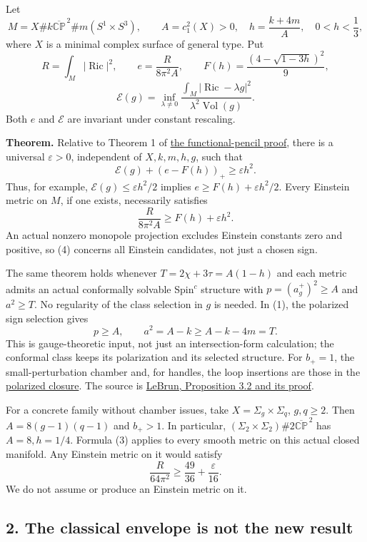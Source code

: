 \documentclass[
  10pt,
]{article}
\begin{document}
Let \[
 M=X\#k\overline{\mathbb {CP}}^{\,2}\#m(S^1\times S^3),\qquad
 A=c_1^2(X)>0,\quad h=\frac{k+4m}{A},\quad 0<h<\frac13,
 \tag{1}
\] where \(X\) is a minimal complex surface of general type. Put \[
 R=\int_M|\operatorname{Ric}|^2,\qquad
 e=\frac{R}{8\pi^2A},\qquad
 F(h)=\frac{(4-\sqrt{1-3h})^2}{9},
\] \[
 \mathcal E(g)=\inf_{\lambda\ne0}
 \frac{\int_M|\operatorname{Ric}-\lambda g|^2}
      {\lambda^2\operatorname{Vol}(g)}.
 \tag{2}
\] Both \(e\) and \(\mathcal E\) are invariant under constant rescaling.

\textbf{Theorem.} Relative to Theorem 1 of
\href{line1_functional_pencil.md}{the functional-pencil proof}, there is
a universal \(\varepsilon>0\), independent of \(X,k,m,h,g\), such that
\[
 \boxed{\mathcal E(g)+(e-F(h))_+\ge\varepsilon h^2.}
 \tag{3}
\] Thus, for example, \(\mathcal E(g)\le\varepsilon h^2/2\) implies
\(e\ge F(h)+\varepsilon h^2/2\). Every Einstein metric on \(M\), if one
exists, necessarily satisfies \[
 \boxed{\frac{R}{8\pi^2A}\ge F(h)+\varepsilon h^2.}
 \tag{4}
\] An actual nonzero monopole projection excludes Einstein constants
zero and positive, so (4) concerns all Einstein candidates, not just a
chosen sign.

The same theorem holds whenever \(T=2\chi+3\tau=A(1-h)\) and each metric
admits an actual conformally solvable Spin\(^c\) structure with
\(p=(a_g^+)^2\ge A\) and \(a^2\ge T\). No regularity of the class
selection in \(g\) is needed. In (1), the polarized sign selection gives
\[
 p\ge A,\qquad a^2=A-k\ge A-k-4m=T.
 \tag{5}
\] This is gauge-theoretic input, not just an intersection-form
calculation; the conformal class keeps its polarization and its selected
structure. For \(b_+=1\), the small-perturbation chamber and, for
handles, the loop insertions are those in the
\href{lebrun_stability_closure.md}{polarized closure}. The source is
\href{https://arxiv.org/pdf/math/0003068}{LeBrun, Proposition 3.2 and
its proof}.

For a concrete family without chamber issues, take
\(X=\Sigma_g\times\Sigma_q\), \(g,q\ge2\). Then \(A=8(g-1)(q-1)\) and
\(b_+>1\). In particular,
\((\Sigma_2\times\Sigma_2)\#2\overline{\mathbb {CP}}^{\,2}\) has
\(A=8,h=1/4\). Formula (3) applies to every smooth metric on this actual
closed manifold. Any Einstein metric on it would satisfy \[
 \frac{R}{64\pi^2}\ge\frac{49}{36}+\frac{\varepsilon}{16}.
\] We do not assume or produce an Einstein metric on it.

\hypertarget{the-classical-envelope-is-not-the-new-result}{%
\subsection{2. The classical envelope is not the new
result}\label{the-classical-envelope-is-not-the-new-result}}
\end{document}
